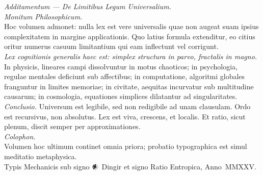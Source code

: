 \documentclass[12pt]{article}
\begin{document}
\begin{spacing}{1.2}
\textit{Additamentum — De Limitibus Legum Universalium.}\\
\textit{Monitum Philosophicum.}\\
Hoc volumen admonet: nulla lex est vere universalis quae non augeat suam ipsius complexitatem in margine applicationis.
Quo latius formula extenditur, eo citius oritur numerus casuum limitantium qui eam inflectunt vel corrigunt.\\
\textit{Lex cognitionis generalis haec est: simplex structura in parvo, fractalis in magno.}\\
In physicis, lineares campi dissolvuntur in motus chaoticos; in psychologia, regulae mentales deficiunt sub affectibus; 
in computatione, algoritmi globales franguntur in limites memoriae; in civitate, aequitas incurvatur sub multitudine causarum; 
in cosmologia, equationes simplices dilatantur ad singularitates.\\
\textit{Conclusio.} Universum est legibile, sed non redigibile ad unam clausulam. 
Ordo est recursivus, non absolutus. Lex est viva, crescens, et localis. 
Et ratio, sicut plenum, discit semper per approximationes.\\[1em]

\textit{Colophon.}\\
Volumen hoc ultimum continet omnia priora; probatio typographica est simul meditatio metaphysica.\\
Typis Mechanicis sub signo 𒀭 Dingir et signo Ratio Entropica, Anno~MMXXV.

\end{spacing}
\end{document}
